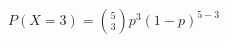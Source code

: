\documentclass[preview]{standalone}
\begin{document}
\begin{align*}
P(X=3) = \binom{5}{3} p^3 (1-p)^{5-3}
\end{align*}
\end{document}
